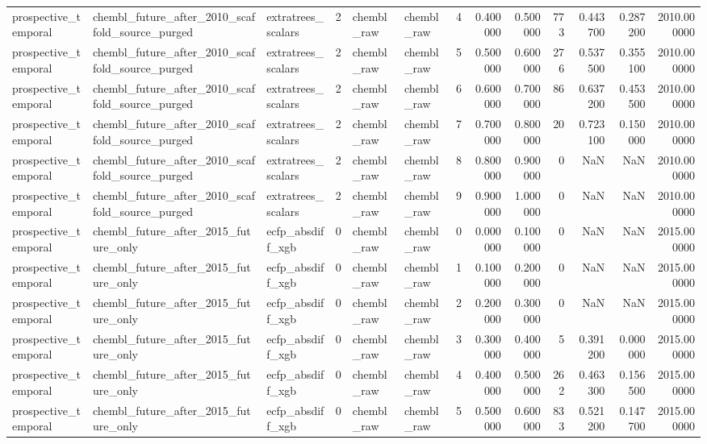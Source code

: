 \begin{longtable}{lllrllrrrrrrr}
prospective\_temporal & chembl\_future\_after\_2010\_scaffold\_source\_purged & extratrees\_scalars & 2 & chembl\_raw & chembl\_raw & 4 & 0.400000 & 0.500000 & 773 & 0.443700 & 0.287200 & 2010.000000 \\
prospective\_temporal & chembl\_future\_after\_2010\_scaffold\_source\_purged & extratrees\_scalars & 2 & chembl\_raw & chembl\_raw & 5 & 0.500000 & 0.600000 & 276 & 0.537500 & 0.355100 & 2010.000000 \\
prospective\_temporal & chembl\_future\_after\_2010\_scaffold\_source\_purged & extratrees\_scalars & 2 & chembl\_raw & chembl\_raw & 6 & 0.600000 & 0.700000 & 86 & 0.637200 & 0.453500 & 2010.000000 \\
prospective\_temporal & chembl\_future\_after\_2010\_scaffold\_source\_purged & extratrees\_scalars & 2 & chembl\_raw & chembl\_raw & 7 & 0.700000 & 0.800000 & 20 & 0.723100 & 0.150000 & 2010.000000 \\
prospective\_temporal & chembl\_future\_after\_2010\_scaffold\_source\_purged & extratrees\_scalars & 2 & chembl\_raw & chembl\_raw & 8 & 0.800000 & 0.900000 & 0 & NaN & NaN & 2010.000000 \\
prospective\_temporal & chembl\_future\_after\_2010\_scaffold\_source\_purged & extratrees\_scalars & 2 & chembl\_raw & chembl\_raw & 9 & 0.900000 & 1.000000 & 0 & NaN & NaN & 2010.000000 \\
prospective\_temporal & chembl\_future\_after\_2015\_future\_only & ecfp\_absdiff\_xgb & 0 & chembl\_raw & chembl\_raw & 0 & 0.000000 & 0.100000 & 0 & NaN & NaN & 2015.000000 \\
prospective\_temporal & chembl\_future\_after\_2015\_future\_only & ecfp\_absdiff\_xgb & 0 & chembl\_raw & chembl\_raw & 1 & 0.100000 & 0.200000 & 0 & NaN & NaN & 2015.000000 \\
prospective\_temporal & chembl\_future\_after\_2015\_future\_only & ecfp\_absdiff\_xgb & 0 & chembl\_raw & chembl\_raw & 2 & 0.200000 & 0.300000 & 0 & NaN & NaN & 2015.000000 \\
prospective\_temporal & chembl\_future\_after\_2015\_future\_only & ecfp\_absdiff\_xgb & 0 & chembl\_raw & chembl\_raw & 3 & 0.300000 & 0.400000 & 5 & 0.391200 & 0.000000 & 2015.000000 \\
prospective\_temporal & chembl\_future\_after\_2015\_future\_only & ecfp\_absdiff\_xgb & 0 & chembl\_raw & chembl\_raw & 4 & 0.400000 & 0.500000 & 262 & 0.463300 & 0.156500 & 2015.000000 \\
prospective\_temporal & chembl\_future\_after\_2015\_future\_only & ecfp\_absdiff\_xgb & 0 & chembl\_raw & chembl\_raw & 5 & 0.500000 & 0.600000 & 833 & 0.521200 & 0.147700 & 2015.000000 \\

\end{longtable}

